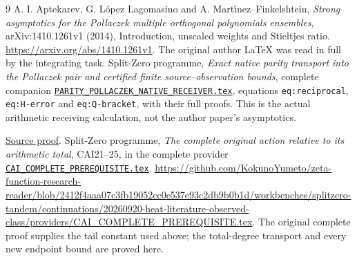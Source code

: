 \documentclass[11pt]{article}
\begin{document}
\begin{thebibliography}{9}
 A. I. Aptekarev, G. L\'opez Lagomasino and
A. Mart\'{\i}nez--Finkelshtein, \emph{Strong asymptotics for the
Pollaczek multiple orthogonal polynomials ensembles},
arXiv:1410.1261v1 (2014), Introduction, unscaled weights and
Stieltjes ratio. \url{https://arxiv.org/abs/1410.1261v1}.
The original author LaTeX was read in full by the integrating task.
 Split-Zero programme, \emph{Exact native parity transport
into the Pollaczek pair and certified finite source--observation bounds},
complete companion \href{https://github.com/KokunoYumeto/zeta-function-research-reader/blob/5992ad50c0f2a06921f1fcaded7b4e38097c0739/workbenches/splitzero-tandem/continuations/20260920-original-kernel-mixed-determinants/providers/PARITY_POLLACZEK_NATIVE_RECEIVER.tex\#L1}{\texttt{PARITY\_POLLACZEK\_NATIVE\_RECEIVER.tex}},
equations \texttt{eq:reciprocal}, \texttt{eq:H-error} and
\texttt{eq:Q-bracket}, with their full proofs. This is the actual
arithmetic receiving calculation, not the author paper's asymptotics.

\href{https://github.com/KokunoYumeto/zeta-function-research-reader/blob/5992ad50c0f2a06921f1fcaded7b4e38097c0739/workbenches/splitzero-tandem/continuations/20260920-original-kernel-mixed-determinants/providers/PARITY_POLLACZEK_NATIVE_RECEIVER.tex\#L1}{Source proof}.
 Split-Zero programme, \emph{The complete original action
relative to its arithmetic total}, CAI21--25, in the complete provider
\href{https://github.com/KokunoYumeto/zeta-function-research-reader/blob/487253b5b01851da5b9b98af4e146fecf1fab902/workbenches/splitzero-tandem/continuations/20260919-full-window-source-products/providers/CAI_COMPLETE_PREREQUISITE.tex\#L1}{\texttt{CAI\_COMPLETE\_PREREQUISITE.tex}}.
\url{https://github.com/KokunoYumeto/zeta-function-research-reader/blob/2412f4aaa07c3fb19052cc0e537e93c2db9b0b1d/workbenches/splitzero-tandem/continuations/20260920-heat-literature-observed-class/providers/CAI_COMPLETE_PREREQUISITE.tex}.
The original complete proof supplies the tail constant used above;
the total-degree transport and every new endpoint bound are proved here.


\end{thebibliography}
\end{document}
